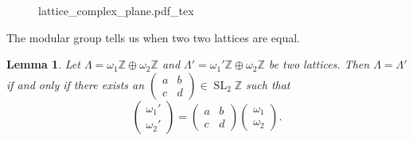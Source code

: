 \documentclass[a4paper]{article}
\newcommand{\incfig}[1]{%
	\def\svgwidth{\columnwidth}
	{#1.pdf_tex}
}
\theoremstyle{theoremdd}
\newtheorem{lemma}[theorem]{Lemma}
\theoremstyle{definitiondd}
\theoremstyle{remarkdd}
\newcommand{\Z}{\mathbb{Z}}
\DeclareMathOperator{\SL}{SL}
\begin{document}
\begin{figure}[h]
	\centering
	\incfig{lattice_complex_plane}
\end{figure}

The modular group tells us when two two lattices are equal. 
\begin{lemma}
	Let $\Lambda = \omega_1\Z \oplus \omega_2\Z$ and $\Lambda' = \omega_1'\Z \oplus \omega_2\Z$ be two lattices. 
	Then $\Lambda = \Lambda'$ if and only if there exists an $\begin{pmatrix} a & b \\ c& d \end{pmatrix} \in \SL_2\Z$ such that \[
	\begin{pmatrix} \omega_1' \\ \omega_2' \end{pmatrix}  = 
	\begin{pmatrix} a & b \\ c& d \end{pmatrix} 
	\begin{pmatrix} \omega_1 \\ \omega_2 \end{pmatrix} 
	.\] 
\end{lemma}
\end{document}
